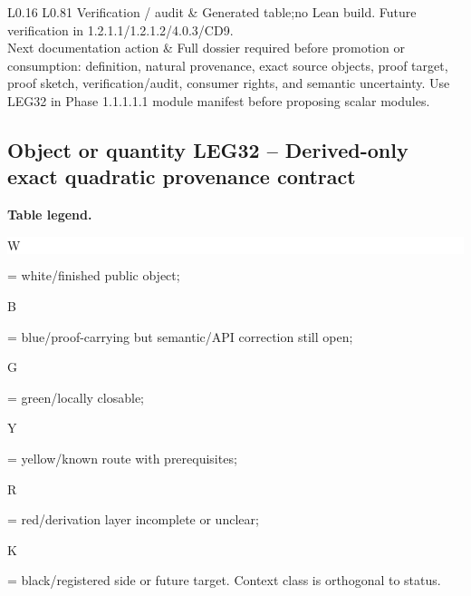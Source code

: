 \begin{longtable}{L{0.16\linewidth} L{0.81\linewidth}}
\hline\addlinespace[0.20em]
Verification /\allowbreak{} audit & Generated table;\newline no Lean build. Future verification in 1.2.1.1/\allowbreak{}1.2.1.2/\allowbreak{}4.0.3/\allowbreak{}CD9.\\
\hline\addlinespace[0.20em]
Next documentation action & Full dossier required before promotion or consumption: definition, natural provenance, exact source objects, proof target, proof sketch, verification/\allowbreak{}audit, consumer rights, and semantic uncertainty. Use LEG32 in Phase 1.1.1.1.1 module manifest before proposing scalar modules.\\
\hline\addlinespace[0.20em]
\end{longtable}
\subsection*{Object or quantity LEG32 -- Derived-only exact quadratic provenance contract}
\hypertarget{objproof:LEG32}{}
\par\smallskip\noindent\begin{minipage}{0.99\linewidth}\footnotesize\raggedright\textbf{Table legend.} \colorbox{white}{\strut W} = white/finished public object; \colorbox{cyan!20}{\strut B} = blue/proof-carrying but semantic/API correction still open; \colorbox{green!18}{\strut G} = green/locally closable; \colorbox{yellow!25}{\strut Y} = yellow/known route with prerequisites; \colorbox{red!20}{\strut R} = red/derivation layer incomplete or unclear; \colorbox{black!18}{\strut K} = black/registered side or future target. Context class is orthogonal to status.\end{minipage}\par\vspace{0.25em}

